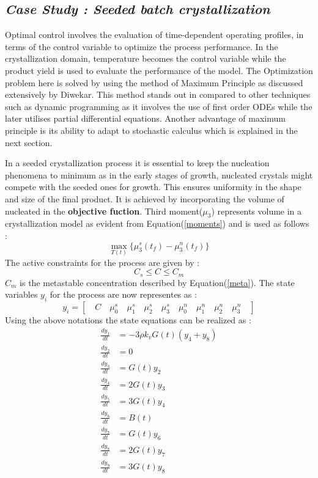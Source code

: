\documentclass[3p,times]{elsarticle}
\begin{document}
\subsection{\textit{Case Study : Seeded batch crystallization}}
Optimal control involves the evaluation of time-dependent operating profiles, in terms of the control variable to optimize the process performance. In the crystallization domain, temperature becomes the control variable while the product yield is used to evaluate the performance of the model. The Optimization problem here is solved by using the method of Maximum Principle as discussed extensively by Diwekar\cite{dewikar}. This method stands out in compared to other techniques such as dynamic programming as it involves the use of first order ODEs while the later utilises partial differential equations. Another advantage of maximum principle is its ability to adapt to stochastic calculus which is explained in the next section. \par 
In a seeded crystallization process it is essential to keep the nucleation phenomena to minimum as in the early stages of growth, nucleated crystals might compete with the seeded ones for growth. This ensures uniformity in the shape and size of the final product. It is achieved by incorporating the volume of nucleated in the \textbf{objective fuction}. Third moment($\mu_{3}$) represents volume in a crystallization model as evident from Equation(\ref{moments}) and is used as follows :
\begin{equation}
\max_{T(t)}\lbrace{\mu_{3}^{s}(t_{f}) - \mu_{3}^{n}(t_{f})\rbrace } 
\end{equation}
The active constraints for the process are given by : 
\begin{equation}
C_{s}\leqslant C \leqslant C_{m}
\end{equation}
$C_{m}$ is the metastable concentration described by Equation(\ref{meta}). The state variables $y_{i}$ for the process are now representes as : 
\begin{equation} \label{states}
y_{i} = \left[\quad C \quad \mu_{0}^{s} \quad \mu_{1}^{s}\quad \mu_{2}^{s}\quad \mu_{3}^{s}\quad \mu_{0}^{n}\quad \mu_{1}^{n}\quad \mu_{2}^{n}\quad \mu_{3}^{n}\quad\right]  
\end{equation}
Using the above notations the state equations can be realized as \cite{yenkie} :
\begin{align} 
\frac{dy_{1}}{dt} &= -3\rho k_{v}G(t)(y_{4}+y_{8}) \\
\frac{dy_{2}}{dt} &= 0 \\
\frac{dy_{3}}{dt} &= G(t)y_{2}  \\
\frac{dy_{4}}{dt} &= 2G(t)y_{3} \\
\frac{dy_{5}}{dt} &= 3G(t)y_{4} \\
\frac{dy_{6}}{dt} &= B(t)  \\
\frac{dy_{7}}{dt} &= G(t)y_{6}  \\
\frac{dy_{8}}{dt} &= 2G(t)y_{7}  \\
\frac{dy_{9}}{dt} &= 3G(t)y_{8}  \\
\end{align} 
\end{document}
